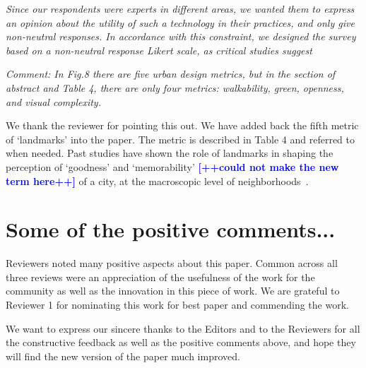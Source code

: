 \documentclass{paper}
\newenvironment{myquote}
{\definecolor{shadecolor}{rgb}{0.9,0.95,1} \begin{shaded*} \sf \em}
{\em\end{shaded*}}
\newenvironment{myquoteOrange}
{\definecolor{shadecolor}{rgb}{1,0.9,0.83} \begin{shaded*} \sf \em}
{\em\end{shaded*}}
\begin{document}
\begin{myquoteOrange}
\textit{Since our respondents were experts in different areas, we wanted them to express an opinion about the utility of such a technology in their practices, and only give non-neutral responses. In accordance with this constraint, we designed the survey based on a non-neutral response Likert scale, as critical studies suggest~\cite{Agree2012,moors2008exploring}}
\end{myquoteOrange}


\begin{myquote}
\noindent Comment: In Fig.8 there are five urban design metrics, but in the section of abstract and Table 4, there are only four metrics: walkability, green, openness, and visual complexity. 
\end{myquote}

\noindent We thank the reviewer for pointing this out. We have added back the fifth metric of `landmarks' into the paper. The metric is described in Table 4 and referred to when needed. Past studies have shown the role of landmarks in shaping the perception of `goodness' and `memorability' \textcolor{blue}{\textbf{[++could not make the new term here++]}} of a city, at the macroscopic level of neighborhoods~\cite{quercia2014aesthetic,lynch1960image}.

\section*{Some of the positive comments...}

\begin{myquote}

\noindent Reviewers noted many positive aspects about this paper. Common across all three reviews were an appreciation of the usefulness of the work for the community as well as the innovation in this piece of work. We are grateful to Reviewer 1 for nominating this work for best paper and commending the work.  

\end{myquote}

We want to express our sincere thanks to the Editors and to the Reviewers for all the constructive feedback as well as the positive comments above, and hope they will find the new version of the paper much improved.



\end{document}
